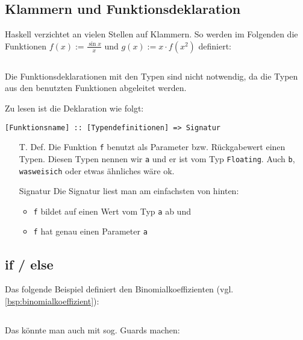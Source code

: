 \subsection{Klammern und Funktionsdeklaration}
Haskell verzichtet an vielen Stellen auf Klammern. So werden im
Folgenden die Funktionen $f(x) := \frac{\sin x}{x}$ und $g(x) := x \cdot f(x^2)$
definiert:

\inputminted[numbersep=5pt, tabsize=4]{haskell}{scripts/haskell/einfaches-beispiel-klammern.hs}

Die Funktionsdeklarationen mit den Typen sind nicht notwendig, da 
die Typen aus den benutzten Funktionen abgeleitet werden.

Zu lesen ist die Deklaration wie folgt:

\begin{center}
\texttt{[Funktionsname] :: \texttt{[Typendefinitionen]} => \texttt{Signatur}}
\end{center}

\begin{itemize}
    \item[T. Def.] Die Funktion \texttt{f} benutzt als Parameter bzw. Rückgabewert
          einen Typen. Diesen Typen nennen wir \texttt{a} und er ist
          vom Typ \texttt{Floating}. Auch \texttt{b}, \texttt{wasweisich}
          oder etwas ähnliches wäre ok.
    \item[Signatur] Die Signatur liest man am einfachsten von hinten:
        \begin{itemize}
            \item \texttt{f} bildet auf einen Wert vom Typ \texttt{a} ab und
            \item \texttt{f} hat genau einen Parameter \texttt{a}
        \end{itemize}
\end{itemize}


\subsection{if / else}%
Das folgende Beispiel definiert den Binomialkoeffizienten (vgl. \cref{bsp:binomialkoeffizient}):

\inputminted[numbersep=5pt, tabsize=4]{haskell}{scripts/haskell/binomialkoeffizient.hs}

Das könnte man auch mit sog. Guards machen:

